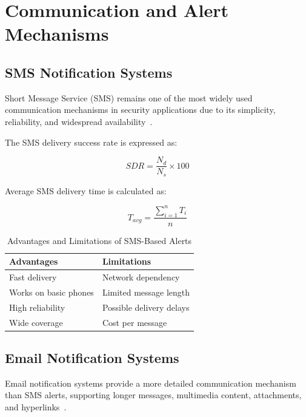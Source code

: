 \documentclass[12pt,a4paper,oneside]{report}
\begin{document}
\section{Communication and Alert Mechanisms}

\subsection{SMS Notification Systems}

Short Message Service (SMS) remains one of the most widely used communication mechanisms in security applications due to its simplicity, reliability, and widespread availability~\cite{ref13,ref20}.

The SMS delivery success rate is expressed as:

\begin{equation}
  SDR = \frac{N_d}{N_s} \times 100
\end{equation}

Average SMS delivery time is calculated as:

\begin{equation}
  T_{avg} = \frac{\sum_{i=1}^{n} T_i}{n}
\end{equation}

\begin{table}[htbp]
  \centering
  \caption{Advantages and Limitations of SMS-Based Alerts}
  {\small
  \begin{tabular}{|p{6.00cm}|p{6.00cm}|}
    \hline
    \textbf{Advantages} & \textbf{Limitations} \\
    \hline
    Fast delivery            & Network dependency \\
    Works on basic phones    & Limited message length \\
    High reliability         & Possible delivery delays \\
    Wide coverage            & Cost per message \\
    \hline
  \end{tabular}
  }
\end{table}

\subsection{Email Notification Systems}

Email notification systems provide a more detailed communication mechanism than SMS alerts, supporting longer messages, multimedia content, attachments, and hyperlinks~\cite{ref15,ref24}.
\end{document}
